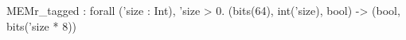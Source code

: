 MEMr_tagged : forall ('size : Int), 'size > 0. (bits(64), int('size), bool) -> (bool, bits('size * 8))